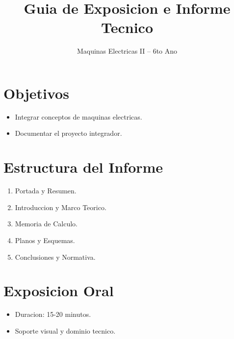 \documentclass[a4paper,11pt]{article}
\begin{document}
\title{Guia de Exposicion e Informe Tecnico}
\author{Maquinas Electricas II -- 6to Ano}
\maketitle
\section{Objetivos}
\begin{itemize}
\item Integrar conceptos de maquinas electricas.
\item Documentar el proyecto integrador.
\end{itemize}
\section{Estructura del Informe}
\begin{enumerate}
\item Portada y Resumen.
\item Introduccion y Marco Teorico.
\item Memoria de Calculo.
\item Planos y Esquemas.
\item Conclusiones y Normativa.
\end{enumerate}
\section{Exposicion Oral}
\begin{itemize}
\item Duracion: 15-20 minutos.
\item Soporte visual y dominio tecnico.
\end{itemize}
\end{document}
